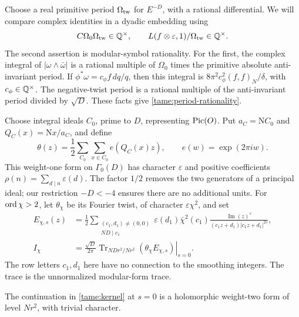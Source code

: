 Choose a real primitive period \(\Omega_{\rm tw}\) for
\(E^{-D}\), with a rational differential. We will compare complex
identities in a dyadic embedding using
\begin{equation}\label{tame:period-rationality}
 C\Omega_0\Omega_{\rm tw}\in\mathbb Q^\times,\qquad
 L(f\otimes\varepsilon,1)/\Omega_{\rm tw}\in\mathbb Q^\times.
\end{equation}
The second assertion is modular-symbol rationality. For the first,
the complex integral of \(|\omega\wedge\bar\omega|\) is a rational
multiple of \(\Omega_0\) times the primitive absolute anti-invariant
period. If \(\phi^*\omega=c_\phi f\,dq/q\), then this integral is
\(8\pi^2c_\phi^2(f,f)_N/\delta\), with \(c_\phi\in\mathbb Q^\times\).
The negative-twist period is a rational multiple of the anti-invariant
period divided by \(\sqrt D\). These facts give
\eqref{tame:period-rationality}.

Choose integral ideals \(C_0\), prime to \(D\), representing
\(\operatorname{Pic}(O)\). Put \(a_C=\mathrm NC_0\) and
\(Q_C(x)=\mathrm Nx/a_C\), and define
\begin{equation}\label{tame:theta}
 \theta(z)=\frac12\sum_{C_0}\sum_{x\in C_0}e(Q_C(x)z),
 \qquad e(w)=\exp(2\pi i w).
\end{equation}
This weight-one form on \(\Gamma_0(D)\) has character \(\varepsilon\)
and positive coefficients
\(\rho(n)=\sum_{d\mid n}\varepsilon(d)\).
The factor \(1/2\) removes the two generators of a principal ideal;
our restriction \(-D<-4\) ensures there are no additional units.
For \(\operatorname{ord}\chi>2\), let \(\theta_\chi\) be its Fourier twist, of
character \(\varepsilon\chi^2\), and set
\begin{equation}\label{tame:kernel}
 \begin{split}
 E_{\chi,s}(z)
   &=\frac12\sum_{\substack{(c_1,d_1)\ne(0,0)\\ND\mid c_1}}
      \varepsilon(d_1)\bar\chi^2(c_1)
      \frac{\operatorname{Im}(z)^s}
      {(c_1z+d_1)|c_1z+d_1|^{2s}},\\
 I_\chi
   &=\left.\frac{\sqrt D}{2\pi}
       \operatorname{Tr}_{NDr^2/Nr^2}
          (\theta_\chi E_{\chi,s})\right|_{s=0}.
 \end{split}
\end{equation}
The row letters \(c_1,d_1\) here have no connection to the smoothing
integers. The trace is the unnormalized modular-form trace.

\begin{lemma}\label{tame:holomorphic}
The continuation in \eqref{tame:kernel} at \(s=0\) is a holomorphic
weight-two form of level \(Nr^2\), with trivial character.
\end{lemma}

